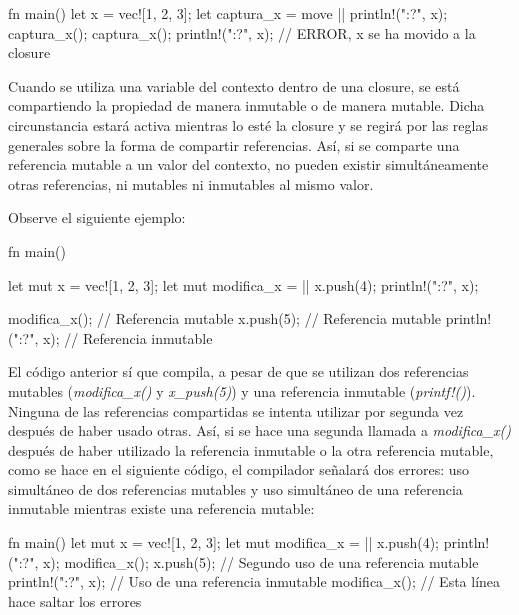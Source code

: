 \vspace{0.7em}
\begin{Codigo}
fn main() {
   let x = vec![1, 2, 3];
   let captura_x =  move || println!("{:?}", x);
   captura_x();
   captura_x();
   println!("{:?}", x); // ERROR, x se ha movido a la closure 
}
\end{Codigo}

Cuando se utiliza una variable del contexto dentro de una closure, se está compartiendo la propiedad de manera inmutable o de manera mutable. Dicha circunstancia estará activa mientras lo esté la closure y se regirá por las reglas generales sobre la forma de compartir referencias. Así, si se comparte una referencia mutable a un valor del contexto, no pueden existir simultáneamente otras referencias, ni mutables ni inmutables al mismo valor. 

Observe el siguiente ejemplo:

\vspace{0.7em}
\begin{Codigo}
fn main() {
   let mut x = vec![1, 2, 3];
   let mut modifica_x =  || {x.push(4); println!("{:?}", x)};
   
   modifica_x(); // Referencia mutable
   x.push(5);    // Referencia mutable
   println!("{:?}", x); // Referencia inmutable
}
\end{Codigo}

El código anterior sí que compila, a pesar de que se utilizan dos referencias mutables (\textit{modifica\_x()} y \textit{x\_push(5)}) y una referencia inmutable (\textit{printf!()}). Ninguna de las referencias compartidas se intenta utilizar por segunda vez después de haber usado otras. Así, si se hace una segunda llamada a \textit{modifica\_x()} después de haber utilizado la referencia inmutable o la otra referencia mutable, como se hace en el siguiente código, el compilador señalará dos errores: uso simultáneo de dos referencias mutables y uso simultáneo de una referencia inmutable mientras existe una referencia mutable:

\vspace{0.7em}
\begin{Codigo}
fn main() {
   let mut x = vec![1, 2, 3];
   let mut modifica_x =  || {x.push(4); println!("{:?}", x)};
   modifica_x();                                              
   x.push(5); // Segundo uso de una referencia mutable        
   println!("{:?}", x); // Uso de una referencia inmutable    
   modifica_x(); // Esta línea hace saltar los errores  
}
\end{Codigo}

